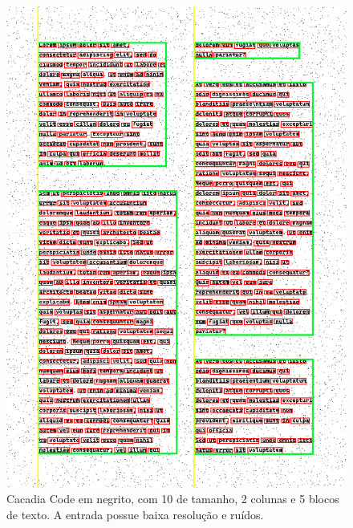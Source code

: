 \documentclass[english, 
               brazil, 
               bsc] %
               {dcomp-abntex2}
\begin{document}
\begin{figure}[htb]
        \caption{\label{cascadia} \small Cacadia Code em negrito, com 10 de tamanho, 2 colunas e 5 blocos de texto. A entrada possue baixa resolução e ruídos. }
        \begin{center}
            \includegraphics[scale=0.55]{./images/cascadia_code_10_detected_colunas_2_blocos_5_linhas_42_palavras_395.png}
        \end{center}
\end{figure}
\end{document}
